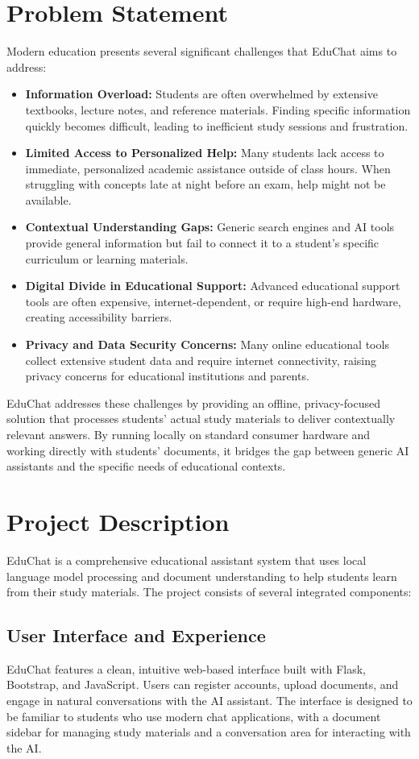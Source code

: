 \documentclass[12pt]{article}
\begin{document}
\section{Problem Statement}
Modern education presents several significant challenges that EduChat aims to address:
\begin{itemize}[leftmargin=2em]
    \item \textbf{Information Overload:} Students are often overwhelmed by extensive textbooks, lecture notes, and reference materials. Finding specific information quickly becomes difficult, leading to inefficient study sessions and frustration.
    \item \textbf{Limited Access to Personalized Help:} Many students lack access to immediate, personalized academic assistance outside of class hours. When struggling with concepts late at night before an exam, help might not be available.
    \item \textbf{Contextual Understanding Gaps:} Generic search engines and AI tools provide general information but fail to connect it to a student's specific curriculum or learning materials.
    \item \textbf{Digital Divide in Educational Support:} Advanced educational support tools are often expensive, internet-dependent, or require high-end hardware, creating accessibility barriers.
    \item \textbf{Privacy and Data Security Concerns:} Many online educational tools collect extensive student data and require internet connectivity, raising privacy concerns for educational institutions and parents.
\end{itemize}
EduChat addresses these challenges by providing an offline, privacy-focused solution that processes students' actual study materials to deliver contextually relevant answers. By running locally on standard consumer hardware and working directly with students' documents, it bridges the gap between generic AI assistants and the specific needs of educational contexts.

\section{Project Description}
EduChat is a comprehensive educational assistant system that uses local language model processing and document understanding to help students learn from their study materials. The project consists of several integrated components:

\subsection{User Interface and Experience}
EduChat features a clean, intuitive web-based interface built with Flask, Bootstrap, and JavaScript. Users can register accounts, upload documents, and engage in natural conversations with the AI assistant. The interface is designed to be familiar to students who use modern chat applications, with a document sidebar for managing study materials and a conversation area for interacting with the AI.
\end{document}
